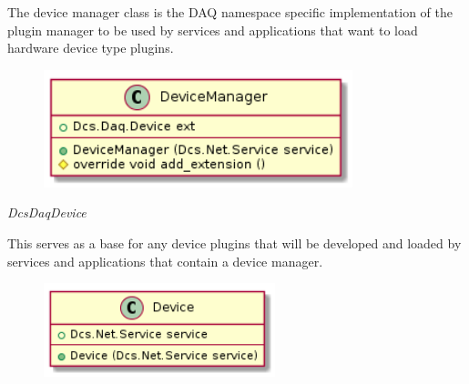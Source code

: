       \vspace*{-0.75cm}
      \begin{minipage}[t]{0.5\textwidth}
        \vspace*{0.5cm}
        The device manager class is the DAQ namespace specific implementation of
        the plugin manager to be used by services and applications that want to
        load hardware device type plugins.
      \end{minipage} \hfill
      \begin{minipage}[t]{0.45\textwidth}
        \begin{figure}[H]
          \includegraphics[width=0.8\textwidth]{figures/design/class/daq/device-manager}
          \label{fig:dsg-classes-daq-device-manager}
        \end{figure}
      \end{minipage}

      \emph{DcsDaqDevice}

      \vspace*{-0.75cm}
      \begin{minipage}[t]{0.5\textwidth}
        \vspace*{0.5cm}
        This serves as a base for any device plugins that will be developed and
        loaded by services and applications that contain a device manager.
      \end{minipage} \hfill
      \begin{minipage}[t]{0.45\textwidth}
        \begin{figure}[H]
          \includegraphics[width=0.6\textwidth]{figures/design/class/daq/device}
          \label{fig:dsg-classes-daq-device}
        \end{figure}
      \end{minipage}

